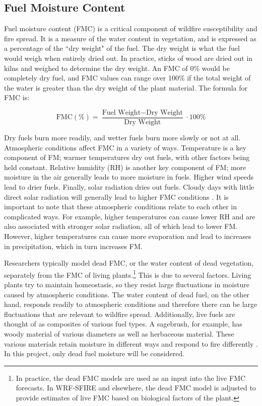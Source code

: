 \documentclass[11pt]{article}%
\begin{document}
\subsection{Fuel Moisture Content}

Fuel moisture content (FMC) is a critical component of wildfire susceptibility and fire spread. It is a measure of the water content in vegetation, and is expressed as a percentage of the ``dry weight" of the fuel. \cite{NCEI-2024-DFM} The dry weight is what the fuel would weigh when entirely dried out. In practice, sticks of wood are dried out in kilns and weighed to determine the dry weight. An FMC of 0\% would be completely dry fuel, and FMC values can range over 100\% if the total weight of the water is greater than the dry weight of the plant material. The formula for FMC is:

\begin{equation}
    \text{FMC} (\%) = \frac{\text{Fuel Weight} - \text{Dry Weight}}{\text{Dry Weight}} \cdot 100\%
\end{equation}

Dry fuels burn more readily, and wetter fuels burn more slowly or not at all. Atmospheric conditions affect FMC in a variety of ways. Temperature is a key component of FM; warmer temperatures dry out fuels, with other factors being held constant. Relative humidity (RH) is another key component of FM; more moisture in the air generally leads to more moisture in fuels. Higher wind speeds lead to drier fuels. Finally, solar radiation dries out fuels. Cloudy days with little direct solar radiation will generally lead to higher FMC conditions \cite{NWCG-FireWeather}. It is important to note that these atmospheric conditions relate to each other in complicated ways. For example, higher temperatures can cause lower RH and are also associated with stronger solar radiation, all of which lead to lower FM. However, higher temperatures can cause more evaporation and lead to increases in precipitation, which in turn increases FM. 

Researchers typically model dead FMC, or the water content of dead vegetation, separately from the FMC of living plants.\footnote{In practice, the dead FMC models are used as an input into the live FMC forecasts. In WRF-SFIRE and elsewhere, the dead FMC model is adjusted to provide estimates of live FMC based on biological factors of the plant.} This is due to several factors. Living plants try to maintain homeostasis, so they resist large fluctuations in moisture caused by atmospheric conditions. The water content of dead fuel, on the other hand, responds readily to atmospheric conditions and therefore there can be large fluctuations that are relevant to wildfire spread. Additionally, live fuels are thought of as composites of various fuel types. A sagebrush, for example, has woody material of various diameters as well as herbaceous material. These various materials retain moisture in different ways and respond to fire differently \cite{NWCG-FireWeather}. In this project, only dead fuel moisture will be considered. 
\end{document}
